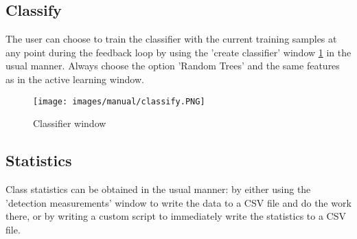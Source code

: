 \subsection{Classify}
The user can choose to train the classifier with the current training samples at any point during the feedback loop by using the 'create classifier' window \ref{fig:class-window} in the usual manner. Always choose the option 'Random Trees' and the same features as in the active learning window. 

\begin{figure}
    \centering
    \texttt{[image: images/manual/classify.PNG]}
    \caption{Classifier window}
    \label{fig:class-window}
\end{figure}

\subsection{Statistics}
Class statistics can be obtained in the usual manner: by either using the 'detection measurements' window to write the data to a CSV file and do the work there, or by writing a custom script to immediately write the statistics to a CSV file.


